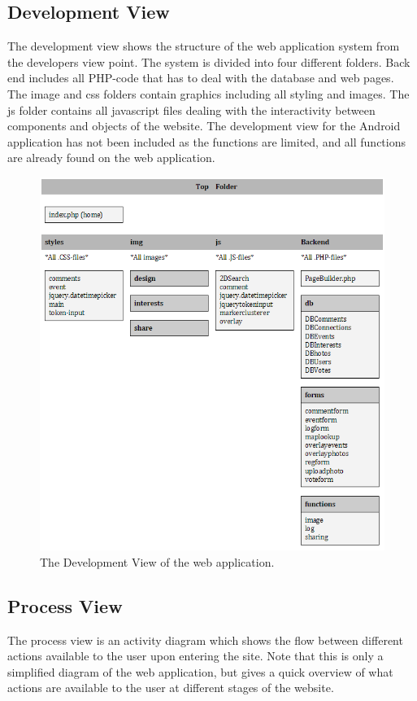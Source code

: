 \subsection{Development View}
\label{subsec:ArchViewsDevelopment}
The development view shows the structure of the web application system from the developers view point. The system is divided into four different folders. Back end includes all PHP-code that has to deal with the database and web pages. The image and css folders contain graphics including all styling and images. The js folder contains all javascript files dealing with the interactivity between components and objects of the website. The development view for the Android application has not been included as the functions are limited, and all functions are already found on the web application.

\begin{figure}
\centering
\includegraphics[width=\linewidth]{./Architecture/img/DevelopmentView.png}
\caption{The Development View of the web application. \label{overflow}}
\end{figure}

\subsection{Process View}
\label{subsec:ArchViewsProcess}
The process view is an activity diagram which shows the flow between different actions available to the user upon entering the site. Note that this is only a simplified diagram of the web application, but gives a quick overview of what actions are available to the user at different stages of the website. 

